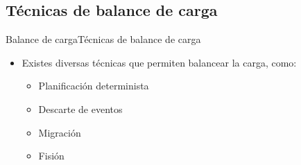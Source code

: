 \subsection*{Técnicas de balance de carga}
\begin{frame}{Balance de carga}{Técnicas de balance de carga}
\begin{itemize}
\item Existes diversas técnicas que permiten balancear la carga, como:
\begin{itemize}
	\item Planificación determinista \cite{XuCTS14, DongTS07}
	\item Descarte de eventos \cite{SheuC09}
	\item Migración \cite{XingZH05}
	\item Fisión \cite{GulisanoJPSV12, IshiiS11, GedikSHW14, FernandezMKP13}
\end{itemize}
\end{itemize}
\end{frame}